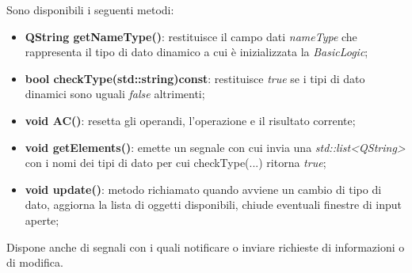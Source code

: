 \documentclass[a4paper,10pt]{article}
\begin{document}
            Sono disponibili i seguenti metodi:
            \begin{itemize}
                \item \textbf{QString getNameType()}: restituisce il campo dati \textit{nameType} che rappresenta il tipo di dato dinamico a cui è inizializzata la \textit{BasicLogic};
                \item \textbf{bool checkType(std::string)const}: restituisce \textit{true} se i tipi di dato dinamici sono uguali \textit{false} altrimenti;
                \item \textbf{void AC()}: resetta gli operandi, l'operazione e il risultato corrente;
                \item \textbf{void getElements()}: emette un segnale con cui invia una \textit{std::list<QString>} con i nomi dei tipi di dato per cui checkType(...) ritorna \textit{true};
                \item \textbf{void update()}: metodo richiamato quando avviene un cambio di tipo di dato, aggiorna la lista di oggetti disponibili, chiude eventuali finestre di input aperte;
            \end{itemize}
            Dispone anche di segnali con i quali notificare o inviare richieste di informazioni o di modifica.
    
\end{document}

